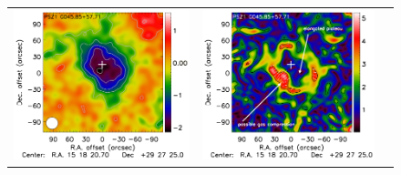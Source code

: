 \documentclass[traditabstract]{aa}
\begin{document}
\begin{figure}[p]
{\begin{tabular}{lll}
\includegraphics[trim=0cm 2.2cm 0cm 0cm, clip=true, scale=1]{Figure/Map_PSZ1G045.pdf} & 
\includegraphics[trim=2.3cm 2.2cm 0cm 0cm, clip=true, scale=1]{Figure/Grad_PSZ1G045_15_15_45.pdf} & 

\end{tabular}}
\end{figure}
\end{document}
